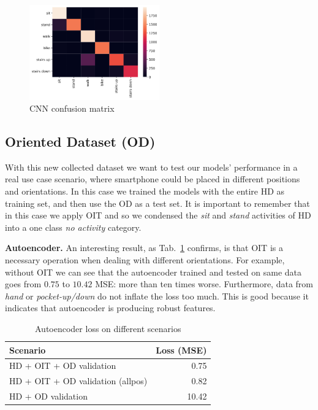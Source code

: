 \vspace{-0.2cm}
\begin{figure}[h]
	\centering
	\includegraphics[width=0.5\textwidth]{images/confusion_matrix.png}
	\caption{CNN confusion matrix}
	\label{fig:cnn-confusion-matrix}
\end{figure}

\vspace{-0.3cm}

\subsection{Oriented Dataset (OD)}

With this new collected dataset we want to test our models' performance
in a real use case scenario, where smartphone could be placed in
different positions and orientations. In this case we trained the
models with the entire HD as training set, and then use the OD as a
test set. It is important to remember that in this case we apply OIT
and so we condensed the \textit{sit} and \textit{stand} activities of
HD into a one class \textit{no activity} category.

\textbf{Autoencoder.}  An interesting result, as
Tab.~\ref{tab:ae-loss} confirms, is that OIT is a necessary operation
when dealing with different orientations. For example, without OIT we can see
that the autoencoder trained and tested on same data goes from $0.75$
to $10.42$ MSE: more than ten times worse. Furthermore, data from
\textit{hand} or \textit{pocket-up/down} do not inflate the loss too much. This is good
because it indicates that autoencoder is producing robust features.

\begin{table}[t]
  \centering
  \begin{tabular}{lr}
    \hline
    Scenario & Loss (MSE) \\
    \hline
    HD + OIT + OD validation & 0.75 \\
    HD + OIT + OD validation (allpos) & 0.82 \\
    HD + OD validation & 10.42 \\
    \hline
  \end{tabular}
  \caption{Autoencoder loss on different scenarios}
  \label{tab:ae-loss}
\end{table}

